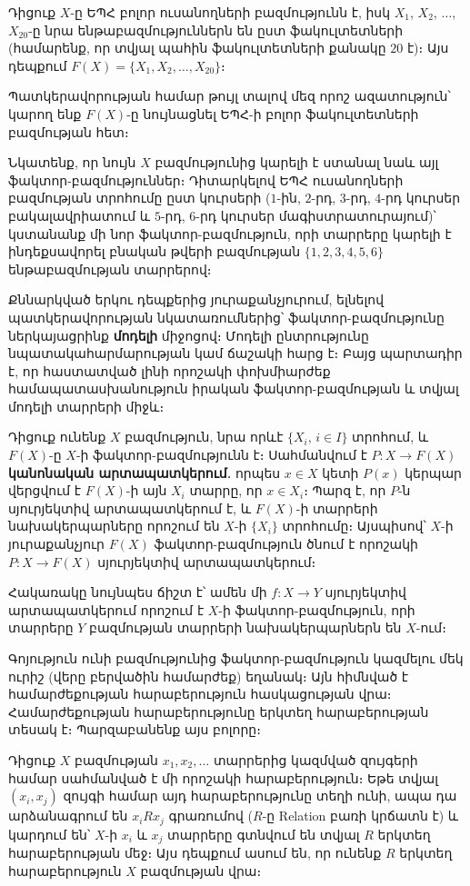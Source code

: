 \documentclass[./main.tex]{subfiles}
\begin{document}
\begin{example}\label{ch2ex5}
Դիցուք $X$-ը ԵՊՀ բոլոր ուսանողների բազմությունն է, իսկ $X_1$, $X_2$, $\dots$, $X_{20}$-ը նրա ենթաբազմություններն են ըստ ֆակուլտետների (համարենք, որ տվյալ պահին ֆակուլտետների քանակը $20$ է)։ Այս դեպքում $F(X)=\{X_1,X_2,\dots,X_{20}\}$։
\par Պատկերավորության համար թույլ տալով մեզ որոշ ազատություն՝ կարող ենք $F(X)$-ը նույնացնել ԵՊՀ-ի բոլոր ֆակուլտետների բազմության հետ։
\par Նկատենք, որ նույն $X$ բազմությունից կարելի է ստանալ նաև այլ ֆակտոր-բազ\-մու\-թյուն\-ներ։
Դիտարկելով ԵՊՀ ուսանողների բազմության տրոհումը ըստ կուրսերի ($1$-ին, $2$-րդ, $3$-րդ, $4$-րդ կուրսեր բա\-կա\-լավ\-րիա\-տում և $5$-րդ, $6$-րդ կուրսեր մա\-գիստ\-րա\-տու\-րա\-յում)՝ կստանանք մի նոր ֆակտոր-բազմություն, որի տարրերը կարելի է ինդեքսավորել բնական թվերի բազմության $\{1,2,3,4,5,6\}$ ենթաբազմության տար\-րե\-րով։
\par Քննարկված երկու դեպքերից յուրաքանչյուրում, ելնելով պատկերավորության նկատառումներից՝ ֆակտոր-բազմությունը ներկայացրինք \textbf{մոդելի} միջոցով։ Մոդելի ընտրությունը նպատակահարմարության կամ ճաշակի հարց է։ Բայց պարտադիր է, որ հաստատված լինի որոշակի փոխմիարժեք համապատասխանություն իրական ֆակտոր-բազմության և տվյալ մոդելի տարրերի միջև։
\end{example}
\label{օրինակ 2:5}
\par Դիցուք ունենք $X$ բազմություն, նրա որևէ $\{X_i,\, i\in I\}$ տրոհում, և $F(X)$-ը $X$-ի ֆակտոր-բազմությունն է։ Սահ\-ման\-վում է $P:X \rightarrow F(X)$ \textbf{կանոնական արտա\-պատ\-կե\-րում}․ որպես $x\in X$ կետի $P(x)$ կերպար վերցվում է $F(X)$-ի այն $X_i$ տարրը, որ $x\in X_i$։ Պարզ է, որ $P$-ն սյուրյեկտիվ արտապատկերում է, և $F(X)$-ի տարրերի նա\-խա\-կեր\-պար\-նե\-րը որոշում են $X$-ի $\{X_i\}$ տրոհումը։ Այսպիսով՝ $X$-ի յուրաքանչյուր $F(X)$ ֆակտոր-բազմություն 
ծնում է որոշակի $P:X\rightarrow F(X)$ սյուրյեկտիվ արտապատ\-կե\-րում։ 
\par Հակառակը նույնպես ճիշտ է՝ ամեն մի $f: X \to Y$ սյուրյեկտիվ արտապատկե\-րում որոշում է $X$-ի ֆակտոր-բազմություն, որի տարրերը $Y$ բազմության տարրերի նախա\-կերպարներն են $X$-ում։
\par Գոյություն ունի բազմությունից ֆակտոր-բազմություն կազմելու մեկ ուրիշ (վերը բերվածին համարժեք) եղանակ։ Այն հիմնված է համարժեքության հարաբերություն հասկացության վրա։ Համարժեքության հարաբերությունը երկտեղ հարաբերության տեսակ է։ Պար\-զա\-բա\-նենք այս բոլորը։
\par Դիցուք $X$ բազմության $x_1,x_2,\dots $ տարրերից կազմված զույգերի համար սահ\-ման\-ված է մի որոշակի հարաբերություն։ Եթե տվյալ $(x_i,x_j)$ զույգի համար այդ հարաբերությունը տեղի ունի, ապա դա արձանագրում են $x_iRx_j$ գրառումով ($R\textrm{-ը}$ Relation բառի կրճատն է) և կարդում են՝ $X$-ի $x_i$ և $x_j$ տարրերը գտնվում են տվյալ $R$ երկտեղ հարաբերության մեջ։ Այս դեպքում ասում են, որ ունենք $R$ երկտեղ հարաբերություն $X$ բազմության վրա։
\end{document}
